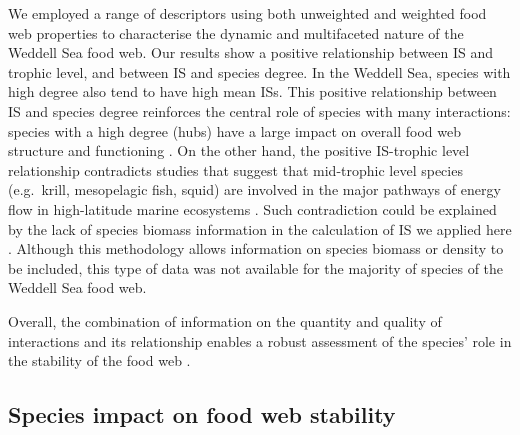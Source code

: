 \documentclass[gc, manuscript]{copernicus}
\begin{document}
We employed a range of descriptors using both unweighted and weighted
food web properties to characterise the dynamic and multifaceted nature
of the Weddell Sea food web. Our results show a positive relationship
between IS and trophic level, and between IS and species degree. In the
Weddell Sea, species with high degree also tend to have high mean ISs.
This positive relationship between IS and species degree reinforces the
central role of species with many interactions: species with a high
degree (hubs) have a large impact on overall food web structure and
functioning \citep{Dunne2002a, Kortsch2015}. On the other hand, the
positive IS-trophic level relationship contradicts studies that suggest
that mid-trophic level species (e.g.~krill, mesopelagic fish, squid) are
involved in the major pathways of energy flow in high-latitude marine
ecosystems
\citep{Pinkerton2014, Murphy2016, McCormack2020, Riccialdelli2020}. Such
contradiction could be explained by the lack of species biomass
information in the calculation of IS we applied here \citep{Pawar2012}.
Although this methodology allows information on species biomass or
density to be included, this type of data was not available for the
majority of species of the Weddell Sea food web.

Overall, the combination of information on the quantity and quality of
interactions and its relationship enables a robust assessment of the
species' role in the stability of the food web \citep{Cirtwill2018a}.

\subsection{Species impact on food web stability}
\end{document}
